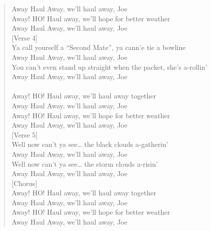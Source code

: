 \documentclass[11pt]{article}
\begin{document}
\begin{verse}
Away Haul Away, we'll haul away, Joe\\
Away! HO! Haul away, we'll hope for better weather\\
Away Haul Away, we'll haul away, Joe\\
\vspace*{1em}
[Verse 4]\\
Ya call yourself a ``Second Mate'', ya cann'e tie a bowline\\
Away Haul Away, we'll haul away, Joe\\
You can't even stand up straight when the packet, she's a-rollin'\\
Away Haul Away, we'll haul away, Joe\\
[Chorus]\\
Away! HO! Haul away, we'll haul away together\\
Away Haul Away, we'll haul away, Joe\\
Away! HO! Haul away, we'll hope for better weather\\
Away Haul Away, we'll haul away, Joe\\
\vspace*{1em}
[Verse 5]\\
Well now can't ya see\ldots{} the black clouds a-gatherin'\\
Away Haul Away, we'll haul away, Joe\\
Well now can't ya see\ldots{} the storm clouds a-risin'\\
Away Haul Away, we'll haul away, Joe\\
\vspace*{1em}
[Chorus]\\
Away! HO! Haul away, we'll haul away together\\
Away Haul Away, we'll haul away, Joe\\
Away! HO! Haul away, we'll hope for better weather\\
Away Haul Away, we'll haul away, Joe\\
\end{verse}
\clearpage
\end{document}
